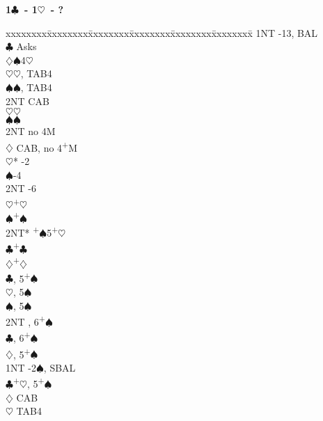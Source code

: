 \documentclass[10pt]{article}
\renewcommand{\c}{$\clubsuit$}
\renewcommand{\d}{$\diamondsuit$}
\newcommand{\h}{$\heartsuit$}
\newcommand{\s}{$\spadesuit$}
\newcommand{\p}{\textsuperscript{+}}
\newenvironment{bidtable}[1][]
{\textbf{#1}
  \begin{adjustwidth}{1em}{}
    \addvspace{2pt}
    \begin{tabbing}
      xxxxxxxx\=xxxxxxxx\=xxxxxxxx\=xxxxxxxx\=xxxxxxxx\=xxxxxxxx\=\kill}
{\end{tabbing}\end{adjustwidth}\bigskip}%
\begin{document}
\begin{multicols*}{2}
\begin{bidtable}[1\c\ - 1\h\ - ?]
\> 1NT -13, BAL                            \\
    \>     \c  \> Asks                          \\
    \>     \>      \d       {}\s 4\h          \\
    \>     \>      \>           \h {}\h, TAB4 \\
    \>     \>      \>           \s {}\s, TAB4 \\
    \>     \>      \>           \> 2NT \> CAB       \\
    \>     \>      \h       {}\h              \\
    \>     \>      \s       {}\s              \\
    \>     \>      \> 2NT       \> no 4M            \\
    \>     \d  \> CAB, no 4\p M                 \\
    \>     \>      \h*      {}-2              \\
    \>     \>      \s       {}-4              \\
    \>     \>      \> 2NT       -6              \\
    \>     \h  {}\p\h                         \\
    \>     \s  {}\p\s                         \\
    \>     \> 2NT* \p\s 5\p\h                   \\
    \>     \c  {}\p\c                         \\
    \>     \d  {}\p\d                         \\
    \c {}, 5\p\s                              \\
    \h {}, 5\s                                \\
    \s {}, 5\s                                \\
    \> 2NT , 6\p\s                              \\
    \c {}, 6\p\s                              \\
    \d {}, 5\p\s                              \\
1NT -2\s, SBAL                                  \\
    \c {}\p\h, 5\p\s                          \\
    \>     \d  \> CAB                           \\
    \>     \h  \> TAB4                          \\

\end{bidtable}
\end{multicols*}
\end{document}
